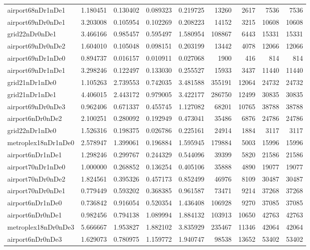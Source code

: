 \begin{longtable}{|l|r|r|r|r|r|r|r|r|}
airport68nDr1nDe1 & 1.180451 & 0.130402 & 0.089323 & 0.219725 & 13260 & 2617 & 7536 & 7536 \\
airport69nDr0nDe1 & 3.203008 & 0.105954 & 0.102269 & 0.208223 & 14152 & 3215 & 10608 & 10608 \\
grid22nDr0nDe1 & 3.466166 & 0.985457 & 0.595497 & 1.580954 & 108867 & 6443 & 15331 & 15331 \\
airport69nDr0nDe2 & 1.604010 & 0.105048 & 0.098151 & 0.203199 & 13442 & 4078 & 12066 & 12066 \\
airport69nDr1nDe0 & 0.894737 & 0.016157 & 0.010911 & 0.027068 & 1900 & 416 & 814 & 814 \\
airport69nDr1nDe1 & 3.298246 & 0.122497 & 0.133030 & 0.255527 & 15933 & 3437 & 11440 & 11440 \\
grid21nDr1nDe0 & 1.105263 & 2.739553 & 0.742035 & 3.481588 & 355191 & 12064 & 24732 & 24732 \\
grid21nDr1nDe1 & 4.406015 & 2.443172 & 0.979005 & 3.422177 & 286750 & 12499 & 30835 & 30835 \\
airport69nDr0nDe3 & 0.962406 & 0.671337 & 0.455745 & 1.127082 & 68201 & 10765 & 38788 & 38788 \\
airport6nDr0nDe2 & 2.100251 & 0.280092 & 0.192949 & 0.473041 & 35486 & 6876 & 24786 & 24786 \\
grid22nDr1nDe0 & 1.526316 & 0.198375 & 0.026786 & 0.225161 & 24914 & 1884 & 3117 & 3117 \\
metroplex18nDr1nDe0 & 2.578947 & 1.399061 & 0.196884 & 1.595945 & 179884 & 5003 & 15996 & 15996 \\
airport6nDr1nDe1 & 1.298246 & 0.299767 & 0.244329 & 0.544096 & 39399 & 5820 & 21586 & 21586 \\
airport70nDr1nDe0 & 1.000000 & 0.268852 & 0.136254 & 0.405106 & 35888 & 4890 & 19077 & 19077 \\
airport70nDr0nDe2 & 1.824561 & 0.395326 & 0.457173 & 0.852499 & 46976 & 8109 & 30487 & 30487 \\
airport70nDr0nDe1 & 0.779449 & 0.593202 & 0.368385 & 0.961587 & 73471 & 9214 & 37268 & 37268 \\
airport6nDr1nDe0 & 0.736842 & 0.916054 & 0.520354 & 1.436408 & 106928 & 9270 & 37085 & 37085 \\
airport6nDr0nDe1 & 0.982456 & 0.794138 & 1.089994 & 1.884132 & 103913 & 10650 & 42763 & 42763 \\
metroplex18nDr0nDe3 & 5.666667 & 1.953827 & 1.882102 & 3.835929 & 235467 & 11346 & 42064 & 42064 \\
airport6nDr0nDe3 & 1.629073 & 0.780975 & 1.159772 & 1.940747 & 98538 & 13652 & 53402 & 53402 \\

\end{longtable}
